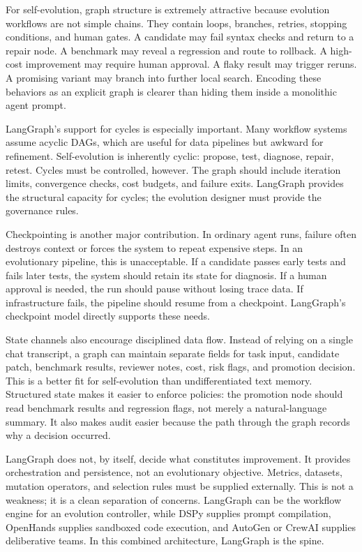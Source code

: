 For self-evolution, graph structure is extremely attractive because evolution workflows are not simple chains.  They contain loops, branches, retries, stopping conditions, and human gates.  A candidate may fail syntax checks and return to a repair node.  A benchmark may reveal a regression and route to rollback.  A high-cost improvement may require human approval.  A flaky result may trigger reruns.  A promising variant may branch into further local search.  Encoding these behaviors as an explicit graph is clearer than hiding them inside a monolithic agent prompt.

LangGraph's support for cycles is especially important.  Many workflow systems assume acyclic DAGs, which are useful for data pipelines but awkward for refinement.  Self-evolution is inherently cyclic: propose, test, diagnose, repair, retest.  Cycles must be controlled, however.  The graph should include iteration limits, convergence checks, cost budgets, and failure exits.  LangGraph provides the structural capacity for cycles; the evolution designer must provide the governance rules.

Checkpointing is another major contribution.  In ordinary agent runs, failure often destroys context or forces the system to repeat expensive steps.  In an evolutionary pipeline, this is unacceptable.  If a candidate passes early tests and fails later tests, the system should retain its state for diagnosis.  If a human approval is needed, the run should pause without losing trace data.  If infrastructure fails, the pipeline should resume from a checkpoint.  LangGraph's checkpoint model directly supports these needs.

State channels also encourage disciplined data flow.  Instead of relying on a single chat transcript, a graph can maintain separate fields for task input, candidate patch, benchmark results, reviewer notes, cost, risk flags, and promotion decision.  This is a better fit for self-evolution than undifferentiated text memory.  Structured state makes it easier to enforce policies: the promotion node should read benchmark results and regression flags, not merely a natural-language summary.  It also makes audit easier because the path through the graph records why a decision occurred.

LangGraph does not, by itself, decide what constitutes improvement.  It provides orchestration and persistence, not an evolutionary objective.  Metrics, datasets, mutation operators, and selection rules must be supplied externally.  This is not a weakness; it is a clean separation of concerns.  LangGraph can be the workflow engine for an evolution controller, while DSPy supplies prompt compilation, OpenHands supplies sandboxed code execution, and AutoGen or CrewAI supplies deliberative teams.  In this combined architecture, LangGraph is the spine.

